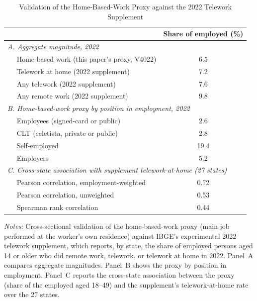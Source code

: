 \begin{table}[H]\centering
\caption{Validation of the Home-Based-Work Proxy against the 2022 Telework Supplement}
\label{tab:proxy_validation}\small
\begin{tabular}{lc}
\toprule
 & Share of employed (\%) \\
\midrule
\multicolumn{2}{l}{\textit{A. Aggregate magnitude, 2022}} \\
$\quad$ Home-based work (this paper's proxy, V4022) & 6.5 \\
$\quad$ Telework at home (2022 supplement) & 7.2 \\
$\quad$ Any telework (2022 supplement) & 7.6 \\
$\quad$ Any remote work (2022 supplement) & 9.8 \\
\midrule
\multicolumn{2}{l}{\textit{B. Home-based-work proxy by position in employment, 2022}} \\
$\quad$ Employees (signed-card or public) & 2.6 \\
$\quad$ CLT (celetista, private or public) & 2.8 \\
$\quad$ Self-employed & 19.4 \\
$\quad$ Employers & 5.2 \\
\midrule
\multicolumn{2}{l}{\textit{C. Cross-state association with supplement telework-at-home (27 states)}} \\
$\quad$ Pearson correlation, employment-weighted & 0.72 \\
$\quad$ Pearson correlation, unweighted & 0.53 \\
$\quad$ Spearman rank correlation & 0.44 \\
\bottomrule\end{tabular}
\par\vspace{3pt}\footnotesize\raggedright \textit{Notes:} Cross-sectional validation of the home-based-work proxy (main job performed at the worker's own residence) against IBGE's experimental 2022 telework supplement, which reports, by state, the share of employed persons aged 14 or older who did remote work, telework, or telework at home in 2022. Panel~A compares aggregate magnitudes. Panel~B shows the proxy by position in employment. Panel~C reports the cross-state association between the proxy (share of the employed aged 18--49) and the supplement's telework-at-home rate over the 27 states.
\end{table}
